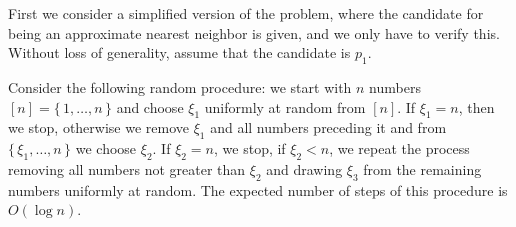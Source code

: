 \documentclass[a4paper,USenglish]{socg-lipics-v2018}
\begin{document}
First we consider a simplified version of the problem, where the candidate for being an approximate nearest neighbor
is given, and we only have to verify this. Without loss of generality, assume that the candidate is $p_1$.

\begin{lemma}
Consider the following random procedure: we start with $n$ numbers $[n] = \{\,1,\dots, n\,\}$ and 
choose $\xi_1$ uniformly at random from $[n]$. If $\xi_1 = n$, then we stop,
otherwise we remove $\xi_1$ and all numbers preceding it and from $\{\,\xi_1, \dots, n\,\}$
we choose $\xi_2$. If $\xi_2 = n$, we stop, if $\xi_2 < n$, we repeat the process removing all numbers not greater than $\xi_2$ and
drawing $\xi_3$ from the remaining numbers uniformly at random. The expected number of steps of this procedure
is $O(\log n)$.
\end{lemma}
\end{document}
